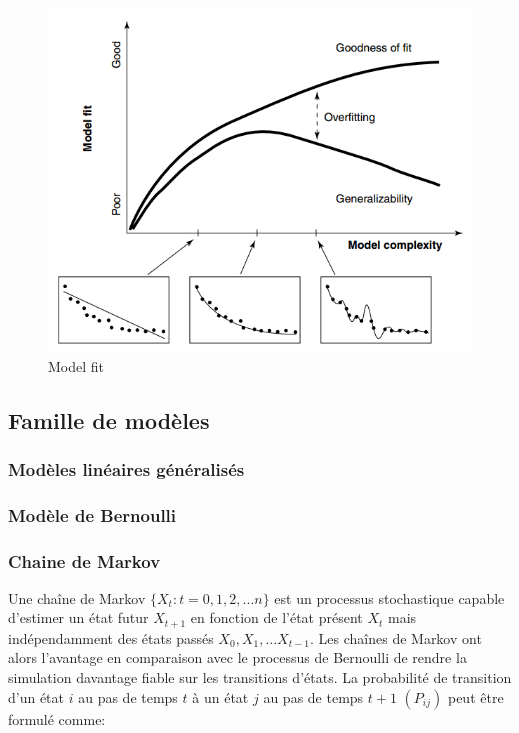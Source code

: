 \begin{figure}[h]
\centering
\includegraphics[scale=0.7]{Images/Model_fit}
\caption{Model fit}
\label{fig:Fit-to-purpose}
\end{figure}

\subsection{Famille de modèles}

\subsubsection{Modèles linéaires généralisés}

\subsubsection{Modèle de Bernoulli}

\subsubsection{Chaine de Markov}
\label{Chaine de Markov}

Une chaîne de Markov $\lbrace X_{t}:t=0,1,2,...n\rbrace$ est un processus stochastique capable d'estimer un état futur $X_{t+1}$ en fonction de l'état présent $X_{t}$ mais indépendamment des états passés $X_{0}, X_{1}, ...X_{t-1}$. Les chaînes de Markov ont alors l'avantage en comparaison avec le processus de Bernoulli de rendre la simulation davantage fiable sur les transitions d'états. La probabilité de transition d'un état $i$ au pas de temps $t$ à un état $j$ au pas de temps $t+1$ $(P_{ij})$ peut être formulé comme:

